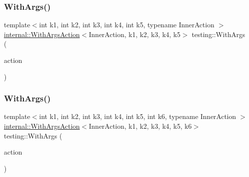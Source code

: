 \mbox{\label{namespacetesting_aa36b0c7216df96bdacf9fe491afd40bd}} 
\subsubsection{\texorpdfstring{WithArgs()}{WithArgs()}\hspace{0.1cm}{\footnotesize\ttfamily [5/10]}}
{\footnotesize\ttfamily template$<$int k1, int k2, int k3, int k4, int k5, typename Inner\+Action $>$ \\
\mbox{\hyperlink{classtesting_1_1internal_1_1WithArgsAction}{internal\+::\+With\+Args\+Action}}$<$Inner\+Action, k1, k2, k3, k4, k5$>$ testing\+::\+With\+Args (\begin{DoxyParamCaption}\item[{const Inner\+Action \&}]{action }\end{DoxyParamCaption})\hspace{0.3cm}{\ttfamily [inline]}}

\mbox{\label{namespacetesting_a6df9cd27659e5943b5d3d77fc4f102e3}} 
\subsubsection{\texorpdfstring{WithArgs()}{WithArgs()}\hspace{0.1cm}{\footnotesize\ttfamily [6/10]}}
{\footnotesize\ttfamily template$<$int k1, int k2, int k3, int k4, int k5, int k6, typename Inner\+Action $>$ \\
\mbox{\hyperlink{classtesting_1_1internal_1_1WithArgsAction}{internal\+::\+With\+Args\+Action}}$<$Inner\+Action, k1, k2, k3, k4, k5, k6$>$ testing\+::\+With\+Args (\begin{DoxyParamCaption}\item[{const Inner\+Action \&}]{action }\end{DoxyParamCaption})\hspace{0.3cm}{\ttfamily [inline]}}

\mbox{\label{namespacetesting_a04146a27847141c6942e9c67a85aadbe}} 
